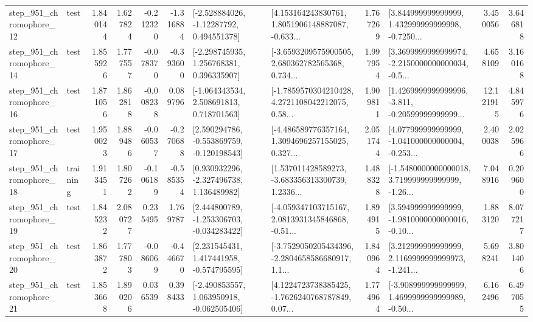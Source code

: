 \begin{tabular}{llrrrrllrlrr}
  step\_951\_chromophore\_12 &      test &      1.840144 &    1.627824 &     -0.212320 & -1.316884 &    [-2.528884026, -1.12287792, 0.494551378] &  [4.153164243830761, 1.8051906148887087, -0.633... &       1.767269 &  [3.844999999999999, 1.432999999999998, -0.7250... &            3.450056 &          3.646818 \\
  step\_951\_chromophore\_14 &      test &      1.855926 &    1.777557 &     -0.078370 & -0.393600 &    [-2.298745935, 1.256768381, 0.396335907] &  [-3.6593209575900505, 2.680362782565368, 0.734... &       1.997954 &  [3.3699999999999974, -2.2150000000000034, -0.5... &            4.658109 &          3.160168 \\
  step\_951\_chromophore\_16 &      test &      1.871056 &    1.862818 &     -0.008238 &  0.089796 &    [-1.064343534, 2.508691813, 0.718701563] &  [-1.7859570304210428, 4.2721108042212075, 0.58... &       1.909811 &  [1.4269999999999996, -3.811, -0.20599999999999... &           12.121915 &          4.845976 \\
  step\_951\_chromophore\_17 &      test &      1.950023 &    1.889486 &     -0.060537 & -0.270688 &   [2.590294786, -0.553869759, -0.120198543] &  [-4.486589776357164, 1.3094696257155025, 0.327... &       2.051744 &  [4.077999999999999, -1.041000000000004, -0.253... &            2.400038 &          2.025966 \\
  step\_951\_chromophore\_18 &  training &      1.913451 &    1.807262 &     -0.106189 & -0.585354 &    [0.930932296, -2.327496738, 1.136489982] &  [1.537011428589273, -3.683356313300739, 1.2336... &       1.488328 &  [-1.5480000000000018, 3.719999999999999, -1.26... &            7.048916 &          0.209600 \\
  step\_951\_chromophore\_19 &      test &      1.845232 &    2.080727 &      0.235495 &  1.769787 &   [2.444800789, -1.253306703, -0.034283422] &  [-4.059347103715167, 2.0813931345846868, -0.51... &       1.894915 &  [3.594999999999999, -1.9810000000000016, -0.10... &            1.883120 &          8.077217 \\
  step\_951\_chromophore\_20 &      test &      1.863872 &    1.777803 &     -0.086069 & -0.446670 &    [2.231545431, 1.417441958, -0.574795595] &  [-3.7529050205434396, -2.2804658586680917, 1.1... &       1.840964 &  [3.212999999999999, 2.1169999999999973, -1.241... &            5.698241 &          3.801406 \\
  step\_951\_chromophore\_21 &      test &      1.853668 &    1.890206 &      0.036539 &  0.398433 &   [-2.490853557, 1.063950918, -0.062505406] &  [4.1224723738385425, -1.7626240768787849, 0.07... &       1.774964 &  [-3.908999999999999, 1.4699999999999989, -0.50... &            6.162496 &          6.497055 \\

\end{tabular}

